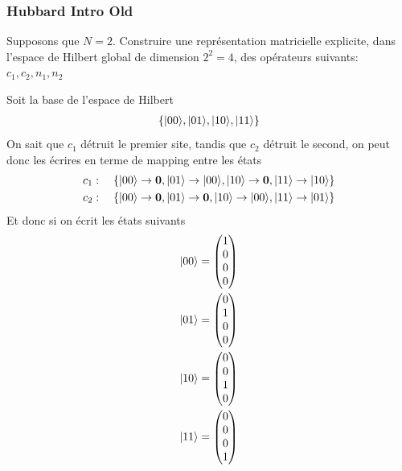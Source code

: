 \documentclass{subfiles}[../main.tex]
\begin{document}
            \subsubsection{Hubbard Intro Old} %
            \label{sec:Hubbard Intro Old}
            \begin{problem}
                Supposons que $N=2$.
            Construire une représentation matricielle
            explicite, dans l'espace de Hilbert global
            de dimension $2^2=4$, des opérateurs suivants:
            $c_1,c_2,n_1,n_2$
            \end{problem}
            Soit la base de l'espace de Hilbert
            \begin{align}
                \left\{
                |{00}\rangle,|{01}\rangle,|{10}\rangle,|{11}\rangle
                    \right\}
            \end{align}
            On sait que $c_1$ détruit le premier site, tandis que $c_2$ détruit
            le second, on peut donc les écrires en terme de mapping entre les
            états
            \begin{align}
                c_1:\quad\left\{
                    |{00}\rangle\rightarrow\mathbf{0},
                    |{01}\rangle\rightarrow|{00}\rangle,
                    |{10}\rangle\rightarrow\mathbf{0},
                    |{11}\rangle\rightarrow|{10}\rangle
                    \right\}\\
                c_2:\quad\left\{
                    |{00}\rangle\rightarrow\mathbf{0},
                    |{01}\rangle\rightarrow\mathbf{0},
                    |{10}\rangle\rightarrow|{00}\rangle,
                    |{11}\rangle\rightarrow|{01}\rangle
                    \right\}
            \end{align}
            Et donc si on écrit les états suivants
            \begin{align}
                |{00}\rangle&=\begin{pmatrix}
                    1\\0\\0\\0
                \end{pmatrix}\\
                |{01}\rangle&=\begin{pmatrix}
                    0\\1\\0\\0
                \end{pmatrix}\\
                |{10}\rangle&=\begin{pmatrix}
                    0\\0\\1\\0
                \end{pmatrix}\\
                |{11}\rangle&=\begin{pmatrix}
                    0\\0\\0\\1
                \end{pmatrix}
            \end{align}
\end{document}
